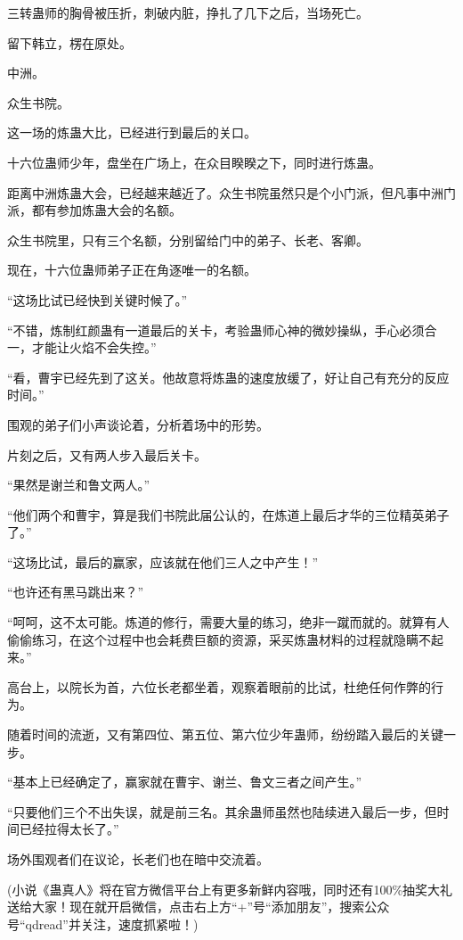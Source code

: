 \begin{this_body}
三转蛊师的胸骨被压折，刺破内脏，挣扎了几下之后，当场死亡。

留下韩立，楞在原处。

中洲。

众生书院。

这一场的炼蛊大比，已经进行到最后的关口。

十六位蛊师少年，盘坐在广场上，在众目睽睽之下，同时进行炼蛊。

距离中洲炼蛊大会，已经越来越近了。众生书院虽然只是个小门派，但凡事中洲门派，都有参加炼蛊大会的名额。

众生书院里，只有三个名额，分别留给门中的弟子、长老、客卿。

现在，十六位蛊师弟子正在角逐唯一的名额。

“这场比试已经快到关键时候了。”

“不错，炼制红颜蛊有一道最后的关卡，考验蛊师心神的微妙操纵，手心必须合一，才能让火焰不会失控。”

“看，曹宇已经先到了这关。他故意将炼蛊的速度放缓了，好让自己有充分的反应时间。”

围观的弟子们小声谈论着，分析着场中的形势。

片刻之后，又有两人步入最后关卡。

“果然是谢兰和鲁文两人。”

“他们两个和曹宇，算是我们书院此届公认的，在炼道上最后才华的三位精英弟子了。”

“这场比试，最后的赢家，应该就在他们三人之中产生！”

“也许还有黑马跳出来？”

“呵呵，这不太可能。炼道的修行，需要大量的练习，绝非一蹴而就的。就算有人偷偷练习，在这个过程中也会耗费巨额的资源，采买炼蛊材料的过程就隐瞒不起来。”

高台上，以院长为首，六位长老都坐着，观察着眼前的比试，杜绝任何作弊的行为。

随着时间的流逝，又有第四位、第五位、第六位少年蛊师，纷纷踏入最后的关键一步。

“基本上已经确定了，赢家就在曹宇、谢兰、鲁文三者之间产生。”

“只要他们三个不出失误，就是前三名。其余蛊师虽然也陆续进入最后一步，但时间已经拉得太长了。”

场外围观者们在议论，长老们也在暗中交流着。

(小说《蛊真人》将在官方微信平台上有更多新鲜内容哦，同时还有100\%抽奖大礼送给大家！现在就开启微信，点击右上方“+”号“添加朋友”，搜索公众号“qdread”并关注，速度抓紧啦！)

\end{this_body}

